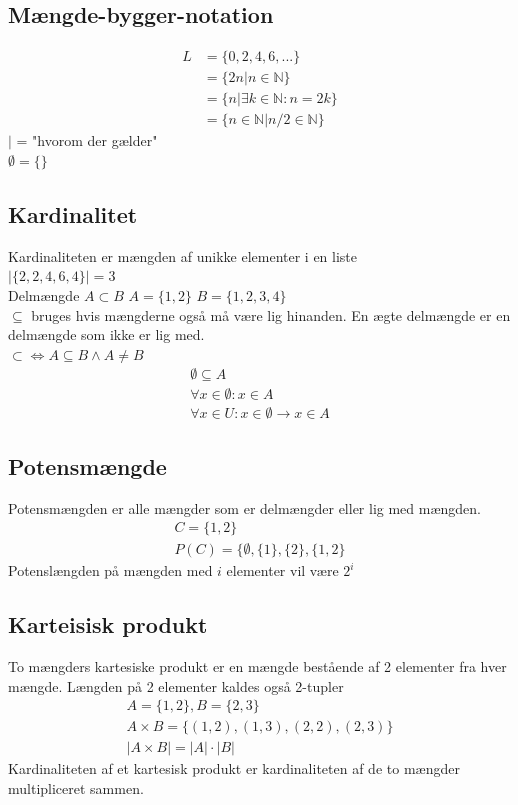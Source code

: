 \documentclass[12pt, a4paper]{article}
\begin{document}
			\subsection{Mængde-bygger-notation}
				\begin{align*}
					L&=\{0,2,4,6,...\}\\
					 &=\{2n|n\in\mathbb{N}\}\\
					 &=\{n|\exists k \in \mathbb{N}:n=2k\}\\
					 &=\{n\in\mathbb{N}| n/2\in\mathbb{N}\}
				\end{align*}
				$|$ = "hvorom der gælder"\\
				$\emptyset = \{\}$\\
			\subsection{Kardinalitet}
				Kardinaliteten er mængden af unikke elementer i en liste\\
				$|\{2,2,4,6,4\}|=3$\\
				Delmængde $A\subset B$ $A=\{1,2\}$ $B=\{1,2,3,4\}$\\
				$\subseteq$ bruges hvis mængderne også må være lig hinanden. En ægte delmængde er en delmængde som ikke er lig med.\\
				$\subset \iff A\subseteq B \land A\neq B$
				\begin{align*}
					\emptyset \subseteq A\\
					\forall x \in \emptyset : x \in A\\
					\forall x \in U : x\in \emptyset \rightarrow x \in A
				\end{align*}
			\subsection{Potensmængde}
				Potensmængden er alle mængder som er delmængder eller lig med mængden.\\
				\begin{align*}
					C=\{1,2\}\\
					P(C)=\{\emptyset,\{1\},\{2\},\{1,2\}
				\end{align*}
				Potenslængden på mængden med $i$ elementer vil være $2^i$
			\subsection{Karteisisk produkt}
				To mængders kartesiske produkt er en mængde bestående af 2 elementer fra hver mængde. Længden på 2 elementer kaldes også 2-tupler\\
				\begin{align*}
					A=\{1,2\}, B=\{2,3\}\\
					A\times B = \{(1,2),(1,3),(2,2),(2,3)\}\\
					|A\times B| = |A| \cdot |B|
				\end{align*}
				Kardinaliteten af et kartesisk produkt er kardinaliteten af de to mængder multipliceret sammen.\\
\end{document}
